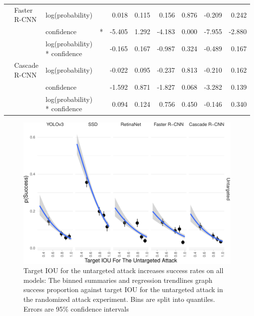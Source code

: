 \documentclass[
]{article}
\begin{document}
\begin{longtable}[t]{llllrrrrrr}
\cmidrule{2-10}\nopagebreak
\hspace{1em} & Faster R-CNN & log(probability) &  & 0.018 & 0.115 & 0.156 & 0.876 & -0.209 & 0.242\\
\cmidrule{3-10}\nopagebreak
\hspace{1em} &  & confidence & * & -5.405 & 1.292 & -4.183 & 0.000 & -7.955 & -2.880\\
\cmidrule{3-10}\nopagebreak
\hspace{1em} &  & log(probability) * confidence &  & -0.165 & 0.167 & -0.987 & 0.324 & -0.489 & 0.167\\
\cmidrule{2-10}\nopagebreak
\hspace{1em} & Cascade R-CNN & log(probability) &  & -0.022 & 0.095 & -0.237 & 0.813 & -0.210 & 0.162\\
\cmidrule{3-10}\nopagebreak
\hspace{1em} &  & confidence &  & -1.592 & 0.871 & -1.827 & 0.068 & -3.282 & 0.139\\
\cmidrule{3-10}\nopagebreak
\hspace{1em} &  & log(probability) * confidence &  & 0.094 & 0.124 & 0.756 & 0.450 & -0.146 & 0.340\\
\bottomrule
\end{longtable}
\endgroup{}

\begin{figure}[tb]

{\centering \includegraphics{imgs/untarget_iou_graph-1} 

}

\caption{Target IOU for the untargeted attack increases success rates on all models:  The binned summaries and regression trendlines graph success proportion against target IOU for the untargeted attack in the randomized attack experiment. Bins are split into quantiles. Errors are 95\% confidence intervals}\label{fig:untarget_iou_graph}
\end{figure}
\end{document}
